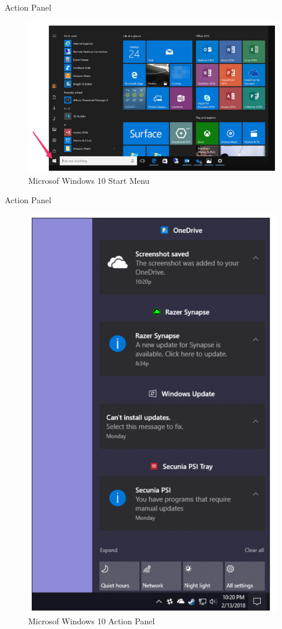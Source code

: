 \documentclass{beamer}
\begin{document}
\begin{frame}[t]{Action Panel}
	\begin{figure}[h]
		\centering
		\includegraphics[scale=0.5]{images/lec08-pic07.png}
		\caption{Microsof Windows 10 Start Menu}
	\end{figure}
\end{frame}

\begin{frame}[t]{Action Panel}
	\begin{figure}[h]
		\centering
		\includegraphics[scale=0.4]{images/lec08-pic08.png}
		\caption{Microsof Windows 10 Action Panel}
	\end{figure}
\end{frame}
\end{document}
